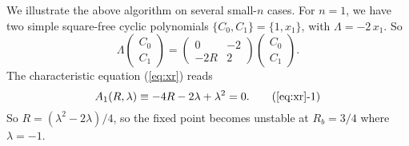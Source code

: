 \documentclass{ws-ijbc}
\begin{document}
We illustrate the above algorithm on several small-$n$ cases.
%
%
%
For $n = 1$, %
we have two simple square-free cyclic polynomials
$\{C_0, C_1\} = \{1, x_1\}$, with
$\Lambda = -2 \, x_1$. So
\[
  \Lambda
  \left( \begin{array}{c}
  C_0 \\
  C_1
  \end{array} \right)
  =
  \left( \begin{array}{cc}
  0     & -2 \\
  -2R   &  2
  \end{array}\right)
  \left( \begin{array}{c}
  C_0 \\
  C_1
  \end{array} \right).
\]
The characteristic equation (\ref{eq:xr}) reads
\begin{equation}
A_1\Rlam
  \equiv -4R - 2\lambda + \lambda^2
  = 0.
  \tag{\ref{eq:xr}-1}
\label{eq:xr1}
\end{equation}
So $R = (\lambda^2 -2\lambda)/4$,
  so the fixed point becomes unstable at $R_b = 3/4$ where $\lambda = -1$.
\end{document}
